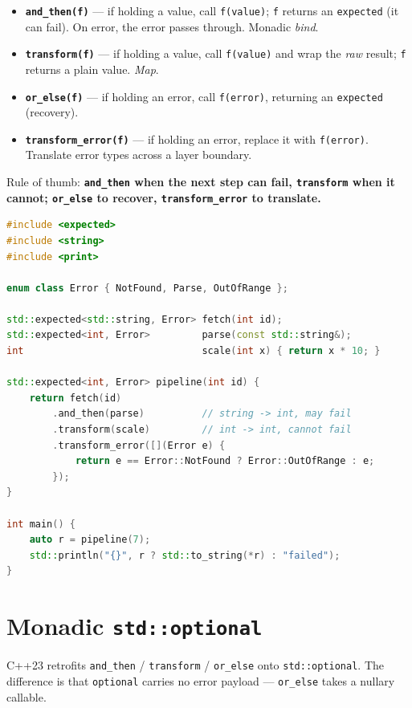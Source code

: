 \begin{itemize}
    \item \textbf{\lstinline|and_then(f)|} --- if holding a value, call \lstinline|f(value)|; \lstinline|f| returns an \lstinline|expected| (it can fail). On error, the error passes through. Monadic \emph{bind}.
    \item \textbf{\lstinline|transform(f)|} --- if holding a value, call \lstinline|f(value)| and wrap the \emph{raw} result; \lstinline|f| returns a plain value. \emph{Map}.
    \item \textbf{\lstinline|or_else(f)|} --- if holding an error, call \lstinline|f(error)|, returning an \lstinline|expected| (recovery).
    \item \textbf{\lstinline|transform_error(f)|} --- if holding an error, replace it with \lstinline|f(error)|. Translate error types across a layer boundary.
\end{itemize}

Rule of thumb: \textbf{\lstinline|and_then| when the next step can fail, \lstinline|transform| when it cannot; \lstinline|or_else| to recover, \lstinline|transform_error| to translate.}

\begin{lstlisting}[language=C++, caption={A flat, fail-fast pipeline over expected}]
#include <expected>
#include <string>
#include <print>

enum class Error { NotFound, Parse, OutOfRange };

std::expected<std::string, Error> fetch(int id);
std::expected<int, Error>         parse(const std::string&);
int                               scale(int x) { return x * 10; }

std::expected<int, Error> pipeline(int id) {
    return fetch(id)
        .and_then(parse)          // string -> int, may fail
        .transform(scale)         // int -> int, cannot fail
        .transform_error([](Error e) {
            return e == Error::NotFound ? Error::OutOfRange : e;
        });
}

int main() {
    auto r = pipeline(7);
    std::println("{}", r ? std::to_string(*r) : "failed");
}
\end{lstlisting}

\section{Monadic \texttt{std::optional}}

C++23 retrofits \lstinline|and_then| / \lstinline|transform| / \lstinline|or_else| onto \lstinline|std::optional|. The difference is that \lstinline|optional| carries no error payload --- \lstinline|or_else| takes a nullary callable.

